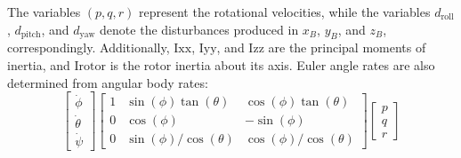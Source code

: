 \documentclass[3p,times]{elsarticle}
\begin{document}
\noindent The variables $(p, q, r)$ represent the rotational velocities, while the variables $d_{\text{roll}}$, $d_{\text{pitch}}$, and $d_{\text{yaw}}$ denote the disturbances produced in $x_B$, $y_B$, and $z_B$, correspondingly. Additionally, $\mathrm{I}{\text{xx}}$, $\mathrm{I}{\text{yy}}$, and $\mathrm{I}{\text{zz}}$ are the principal moments of inertia, and $\mathrm{I}{\text{rotor}}$ is the rotor inertia about its axis. Euler angle rates are also determined from angular body rates:
\begin{equation}
	\begin{bmatrix}
	\dot\phi \\
	\dot\theta \\
	\dot\psi
	\end{bmatrix}
	\begin{bmatrix}
	1 & \sin(\phi)\tan(\theta) & \cos(\phi)\tan(\theta) \\
	0 & \cos(\phi) & -\sin(\phi) \\
	0 & \sin(\phi)/\cos(\theta) & \cos(\phi)/\cos(\theta)
	\end{bmatrix}
	\begin{bmatrix}
	p \\
	q \\
	r
	\end{bmatrix}
	\end{equation}
\end{document}
